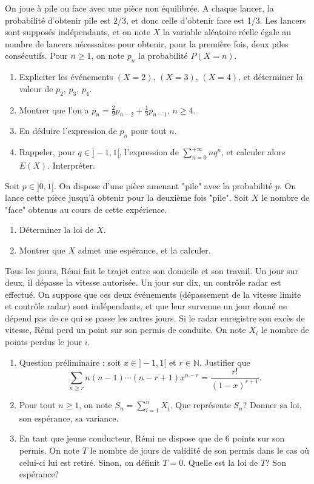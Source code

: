 \documentclass{book}
\begin{document}
\begin{Exercice}
On joue à pile ou face avec une pièce non équilibrée. A chaque lancer, la probabilité d'obtenir pile est 2/3, et donc celle d'obtenir face est 1/3.
Les lancers sont supposés indépendants, et on note $X$ la variable aléatoire réelle égale au nombre de lancers nécessaires pour obtenir, pour la première fois, deux piles consécutifs.
Pour $n\geq 1$, on note $p_n$ la probabilité $P(X=n)$.
\begin{enumerate}
\item Expliciter les événements $(X=2)$, $(X=3)$, $(X=4)$, et déterminer la valeur de $p_2$, $p_3$, $p_4$.
\item Montrer que l'on a $p_n=\frac{2}{9}p_{n-2}+\frac{1}{3}p_{n-1}$, $n\geq 4$.
\item En déduire l'expression de $p_n$ pour tout $n$.
\item Rappeler, pour $q\in]-1,1[$, l'expression de $\sum_{n=0}^{+\infty}nq^n$, et calculer alors $E(X)$. Interpréter.
\end{enumerate}
\end{Exercice}

\begin{Exercice}
Soit $p\in]0,1[$. On dispose d'une pièce amenant "pile" avec la probabilité $p$. On lance cette pièce jusqu'à obtenir pour la deuxième fois "pile". Soit $X$ le nombre de "face" obtenus au cours de cette expérience.
\begin{enumerate}
\item Déterminer la loi de $X$.
\item Montrer que $X$ admet une espérance, et la calculer.
\end{enumerate}
\end{Exercice}

\begin{Exercice}
Tous les jours, Rémi fait le trajet entre son domicile et son travail. Un jour sur deux, il dépasse la vitesse autorisée. Un jour sur dix, un contrôle radar est effectué. On suppose que ces deux événements (dépassement de la vitesse limite et contrôle radar) sont indépendants, et que leur survenue un jour donné ne dépend pas de ce qui se passe les autres jours. Si le radar enregistre son excès de vitesse, Rémi perd un point sur son permis de conduite. On note $X_i$ le nombre de points perdus le jour $i$.
\begin{enumerate}
\item Question préliminaire : soit $x\in ]-1,1[$ et $r\in\mathbb N$. Justifier que 
$$\sum_{n\geq r}n(n-1)\cdots (n-r+1)x^{n-r}=\frac{r!}{(1-x)^{r+1}}.$$
\item Pour tout $n\geq 1$, on note $S_n=\sum_{i=1}^n X_i$. Que représente $S_n$? Donner sa loi, son espérance, sa variance.
\item En tant que jeune conducteur, Rémi ne dispose que de 6 points sur son permis. On note $T$ le nombre de jours de validité de son permis dans le cas où celui-ci lui est retiré. Sinon, on définit $T=0$. Quelle est la loi de $T$? Son espérance?
\end{enumerate}
\end{Exercice}
\end{document}
